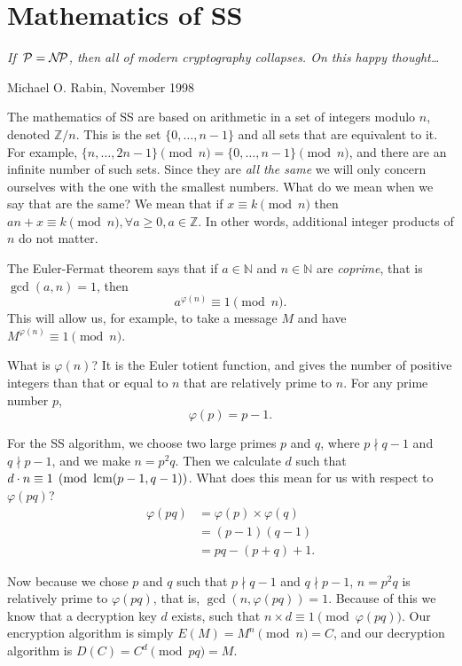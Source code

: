 \section{Mathematics of SS}\label{proof}

\textwidth
\epigraph{\emph{If $\,{\cal P} = \mathcal{N\kern -2ptP}$, then all of modern cryptography collapses. On this happy thought\ldots}}{Michael O.\xspace Rabin, November 1998}

\noindent
The mathematics of SS are based on arithmetic in a set of integers
modulo $n$, denoted $\mathbb{Z}/n$. This is the set $\{ 0, \ldots, n - 1
\}$ and all sets that are equivalent to it. For example, $\{ n, \ldots,
2n -1 \} \pmod{n} = \{ 0, \ldots, n - 1 \} \pmod{n}$, and there are an
infinite number of such sets. Since they are \emph{all the same} we will
only concern ourselves with the one with the smallest numbers. What do
we mean when we say that are the same? We mean that if $x \equiv k
\pmod{n}$ then $a n + x \equiv k \pmod{n}, \forall a \ge 0, a \in
\mathbb{Z}$. In other words, additional integer products of $n$ do not
matter.

The Euler-Fermat theorem says that if $a\in\mathbb{N}$ and
$n\in\mathbb{N}$ are \emph{coprime}, that is $\gcd(a, n) = 1$, then
$$a^{\varphi(n)} \equiv 1 \pmod{n}.$$ This will allow us, for example,
to take a message $M$ and have $M^{\varphi(n)} \equiv 1 \pmod{n}$.

What is $\varphi(n)$? It is the Euler totient function, and gives the
number of positive integers than that or equal to $n$ that are
relatively prime to $n$. For any prime number $p$,
$$
\varphi(p) = p - 1.
$$

For the SS algorithm, we choose two large primes $p$ and $q$, where
$p \nmid q - 1$ and $q \nmid p - 1$, and we make $n = p^2 q$.
Then we calculate $d$ such that $d \cdot n \equiv 1 \pmod{\operatorname{lcm}(p - 1, q - 1)}$.
What does this mean for us with respect to $\varphi(pq)$?
\begin{align*}
        \varphi(pq) & = \varphi(p) \times \varphi(q) \\
        & = (p - 1) (q - 1) \\
        & = pq - (p + q) + 1 .
\end{align*}

Now because we chose $p$ and $q$ such that $p \nmid q - 1$ and $q \nmid p - 1$,
$n = p^2 q$ is relatively prime to $\varphi(pq)$,
that is, $\gcd(n, \varphi(pq)) = 1$. Because of this we know that a decryption key $d$
exists, such that $n \times d \equiv 1 \pmod{\varphi(pq)}$.
Our encryption algorithm is simply $E(M) = M^n \pmod{n} = C$, and our
decryption algorithm is $D(C) = C^d \pmod{pq} = M$.

